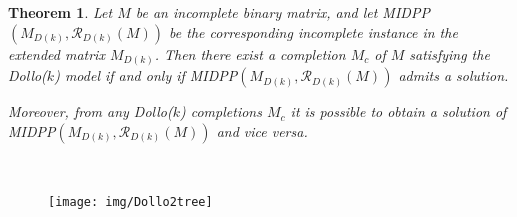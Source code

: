 \documentclass[a4paper,USenglish]{article}
\newtheorem{theorem}{Theorem}
\theoremstyle{definition}
\begin{document}
\begin{theorem}\label{theorem:dollok}
  Let $M$ be an incomplete binary matrix, and let MIDPP$\left(M_{D(k)},\mathcal
    R_{D(k)}(M)\right)$ be the corresponding incomplete instance in the 
  extended matrix $M_{D(k)}$.
%
Then there exist a completion $M_{c}$ of $M$ satisfying the Dollo($k$) model if
and only if MIDPP$\left(M_{D(k)},\mathcal R_{D(k)}(M)\right)$ admits a solution.

Moreover, from  any Dollo($k$) completions  $M_{c}$ it is possible to  obtain a
solution of MIDPP$\left(M_{D(k)},\mathcal R_{D(k)}(M)\right)$ and vice versa.
\end{theorem}


\begin{figure}[tb!]
  \begin{minipage}[b][30pt][c]{0.3\linewidth}
\flushright
{}\\[20pt]

  \end{minipage}
  \begin{minipage}[c]{.65\linewidth}
\centering
\texttt{[image: img/Dollo2tree]}\\\vspace{1em}    
  \end{minipage}


\end{figure}
\end{document}
